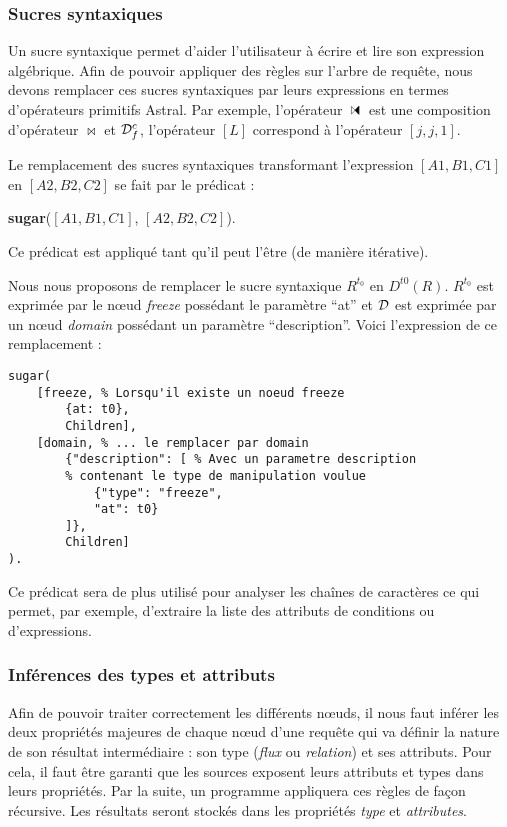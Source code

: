 \subsubsection{Sucres syntaxiques}
Un sucre syntaxique permet d'aider l'utilisateur à écrire et lire son expression algébrique. Afin de pouvoir appliquer des règles sur l'arbre de requête, nous devons remplacer ces sucres syntaxiques par leurs expressions en termes d'opérateurs primitifs Astral. Par exemple, l'opérateur $\ssjoin$ est une composition d'opérateur $\Join$ et $\mathcal{D}_f^c$, l'opérateur $[L]$ correspond à l'opérateur $[j,j,1]$.

\begin{regle}
Le remplacement des sucres syntaxiques transformant l'expression $[A1,B1,C1]$ en $[A2,B2,C2]$ se fait par le prédicat :
\begin{center} \textbf{sugar}($[A1,B1,C1]$, $[A2,B2,C2]$).\end{center}
Ce prédicat est appliqué tant qu'il peut l'être (de manière itérative).
\end{regle}

\begin{example}
	Nous nous proposons de remplacer le sucre syntaxique $R^{t_0}$ en $D^{t0} (R)$. $R^{t_0}$ est exprimée par le nœud \textit{freeze} possédant le paramètre \enquote{at} et $\mathcal{D}$ est exprimée par un nœud \textit{domain} possédant un paramètre \enquote{description}. Voici l'expression de ce remplacement :
	\begin{lstlisting}
sugar(
	[freeze, % Lorsqu'il existe un noeud freeze
		{at: t0},
		Children], 
	[domain, % ... le remplacer par domain
		{"description": [ % Avec un parametre description
		% contenant le type de manipulation voulue
			{"type": "freeze", 
			"at": t0}
		]},
		Children]
).
	\end{lstlisting}
\end{example}

Ce prédicat sera de plus utilisé pour analyser les chaînes de caractères ce qui permet, par exemple, d'extraire la liste des attributs de conditions ou d'expressions.

\subsubsection{Inférences des types et attributs}
Afin de pouvoir traiter correctement les différents nœuds, il nous faut inférer les deux propriétés majeures de chaque nœud d'une requête qui va définir la nature de son résultat intermédiaire : son type (\textit{flux} ou \textit{relation}) et ses attributs. Pour cela, il faut être garanti que les sources exposent leurs attributs et types dans leurs propriétés. Par la suite, un programme appliquera ces règles de façon récursive. Les résultats seront stockés dans les propriétés \textit{type} et \textit{attributes}.

